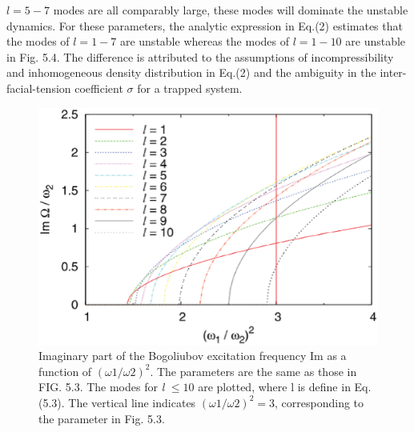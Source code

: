 \documentclass[12pt,a4paper]{report} %
\begin{document}
$l=5-7$ modes are all comparably large, these modes will
dominate the unstable dynamics. For these parameters, the
analytic expression in Eq.(2) estimates that the modes of $l=1-7$
are unstable whereas the modes of $l=1-10$ are unstable
in Fig. 5.4. The difference is attributed to the assumptions of
incompressibility and inhomogeneous density distribution in
Eq.(2) and the ambiguity in the inter-facial-tension coefficient
$\sigma$ for a trapped system.
\begin{figure}[htbp]
\begin{center}
\includegraphics[scale=0.50,keepaspectratio]{5-4.eps}
\caption{
Imaginary part of the Bogoliubov excitation 
frequency Im as a function of $( \omega 1 / \omega 2 )^2$. The parameters
are the same as those in FIG. 5.3. The modes for {\it l} $\le 10$ are plotted,
where l is define in Eq. (5.3). The vertical line indicates $( \omega 1 / \omega 2 )^2 = 3$,
corresponding to the parameter in Fig. 5.3.
}
\label{FIG:5-4}
\end{center}
\end{figure}
\end{document}

